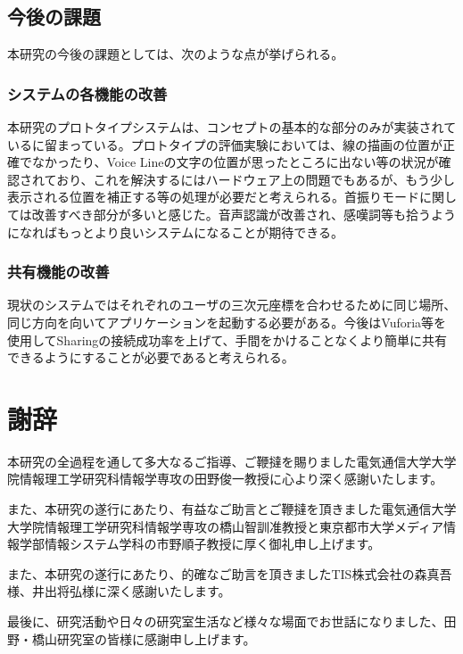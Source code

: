 \documentclass[11pt,a4j, titlepage]{jarticle} %
\begin{document}
\subsection{今後の課題}
本研究の今後の課題としては、次のような点が挙げられる。

\subsubsection*{システムの各機能の改善}
本研究のプロトタイプシステムは、コンセプトの基本的な部分のみが実装されているに留まっている。プロトタイプの評価実験においては、線の描画の位置が正確でなかったり、Voice Lineの文字の位置が思ったところに出ない等の状況が確認されており、これを解決するにはハードウェア上の問題でもあるが、もう少し表示される位置を補正する等の処理が必要だと考えられる。首振りモードに関しては改善すべき部分が多いと感じた。音声認識が改善され、感嘆詞等も拾うようになればもっとより良いシステムになることが期待できる。

\subsubsection*{共有機能の改善}
現状のシステムではそれぞれのユーザの三次元座標を合わせるために同じ場所、同じ方向を向いてアプリケーションを起動する必要がある。今後はVuforia等を使用してSharingの接続成功率を上げて、手間をかけることなくより簡単に共有できるようにすることが必要であると考えられる。

\newpage
\section*{謝辞}
本研究の全過程を通して多大なるご指導、ご鞭撻を賜りました電気通信大学大学院情報理工学研究科情報学専攻の田野俊一教授に心より深く感謝いたします。

また、本研究の遂行にあたり、有益なご助言とご鞭撻を頂きました電気通信大学大学院情報理工学研究科情報学専攻の橋山智訓准教授と東京都市大学メディア情報学部情報システム学科の市野順子教授に厚く御礼申し上げます。

また、本研究の遂行にあたり、的確なご助言を頂きましたTIS株式会社の森真吾様、井出将弘様に深く感謝いたします。

最後に、研究活動や日々の研究室生活など様々な場面でお世話になりました、田野・橋山研究室の皆様に感謝申し上げます。
\end{document}
